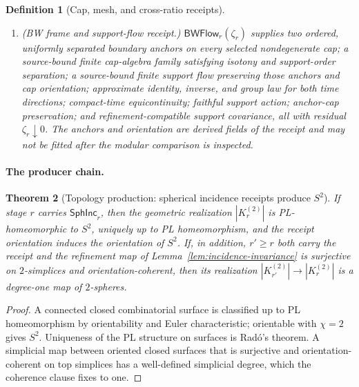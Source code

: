 \documentclass[11pt]{article}
\newtheorem{theorem}{Theorem}[section]
\newtheorem{definition}[theorem]{Definition}
\begin{document}
\begin{definition}[Cap, mesh, and cross-ratio receipts]
\begin{enumerate}[leftmargin=2em]
\item (\emph{BW frame and support-flow receipt}.)
\(\mathsf{BWFlow}_r(\zeta_r)\) supplies two ordered, uniformly separated
boundary anchors on every selected nondegenerate cap; a source-bound finite
cap-algebra family satisfying isotony and support-order separation; a
source-bound finite support flow preserving those anchors and cap orientation; approximate
identity, inverse, and group law for both time directions; compact-time
equicontinuity; faithful support action; anchor-cap preservation; and
refinement-compatible support covariance, all with residual
\(\zeta_r\downarrow0\). The anchors and orientation are derived fields of the
receipt and may not be fitted after the modular comparison is inspected.
\end{enumerate}
\end{definition}

\paragraph{The producer chain.}

\begin{theorem}[Topology production: spherical incidence receipts produce \(S^2\)]
\label{thm:topology-production}
If stage \(r\) carries \(\mathsf{SphInc}_r\), then the geometric realization
\(|K^{(2)}_r|\) is PL-homeomorphic to \(S^2\), uniquely up to PL homeomorphism,
and the receipt orientation induces the orientation of \(S^2\). If, in addition,
\(r'\geq r\) both carry the receipt and the refinement map of
Lemma~\ref{lem:incidence-invariance} is surjective on \(2\)-simplices and
orientation-coherent, then its realization
\(|K^{(2)}_{r'}|\to|K^{(2)}_r|\) is a degree-one map of \(2\)-spheres.
\end{theorem}

\begin{proof}
A connected closed combinatorial surface is classified up to PL homeomorphism
by orientability and Euler characteristic; orientable with \(\chi=2\) gives
\(S^2\). Uniqueness of the PL structure on surfaces is Rad\'o's theorem. A
simplicial map between oriented closed surfaces that is surjective and
orientation-coherent on top simplices has a well-defined simplicial degree,
which the coherence clause fixes to one.
\end{proof}
\end{document}
